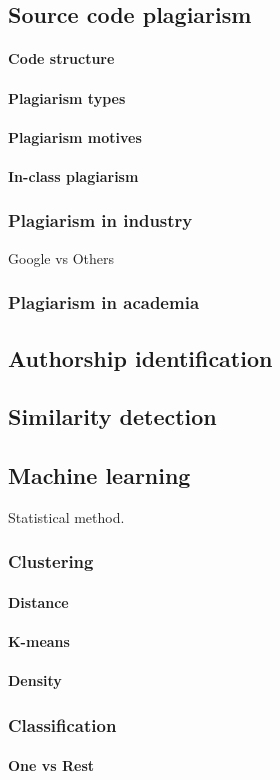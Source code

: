 \subsection{Source code plagiarism}
\paragraph{Code structure}
\paragraph{Plagiarism types}
\paragraph{Plagiarism motives}
\paragraph{In-class plagiarism}


\subsubsection{Plagiarism in industry}

Google vs Others

\subsubsection{Plagiarism in academia}

\subsection{Authorship identification}

\subsection{Similarity detection}

\subsection{Machine learning}

Statistical method.

\subsubsection{Clustering}

\paragraph{Distance}

\paragraph{K-means}

\paragraph{Density}

\subsubsection{Classification}

\paragraph{One vs Rest}